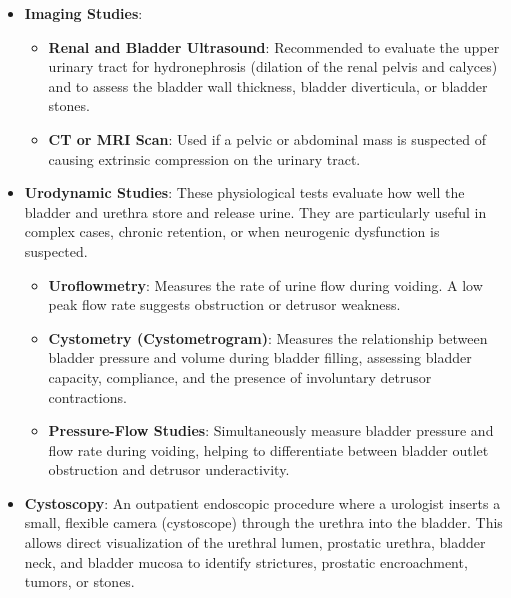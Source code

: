 \begin{itemize}
\begin{itemize}
        \item \textbf{Prostate-Specific Antigen (PSA)}: May be ordered for men to screen for prostate cancer, though it is important to note that acute urinary retention and bladder catheterization can cause transient, significant elevations in PSA levels.
    \end{itemize}
    \item \textbf{Imaging Studies}:
    \begin{itemize}
        \item \textbf{Renal and Bladder Ultrasound}: Recommended to evaluate the upper urinary tract for hydronephrosis (dilation of the renal pelvis and calyces) and to assess the bladder wall thickness, bladder diverticula, or bladder stones.
        \item \textbf{CT or MRI Scan}: Used if a pelvic or abdominal mass is suspected of causing extrinsic compression on the urinary tract.
    \end{itemize}
    \item \textbf{Urodynamic Studies}: These physiological tests evaluate how well the bladder and urethra store and release urine. They are particularly useful in complex cases, chronic retention, or when neurogenic dysfunction is suspected.
    \begin{itemize}
        \item \textbf{Uroflowmetry}: Measures the rate of urine flow during voiding. A low peak flow rate suggests obstruction or detrusor weakness.
        \item \textbf{Cystometry (Cystometrogram)}: Measures the relationship between bladder pressure and volume during bladder filling, assessing bladder capacity, compliance, and the presence of involuntary detrusor contractions.
        \item \textbf{Pressure-Flow Studies}: Simultaneously measure bladder pressure and flow rate during voiding, helping to differentiate between bladder outlet obstruction and detrusor underactivity.
    \end{itemize}
    \item \textbf{Cystoscopy}: An outpatient endoscopic procedure where a urologist inserts a small, flexible camera (cystoscope) through the urethra into the bladder. This allows direct visualization of the urethral lumen, prostatic urethra, bladder neck, and bladder mucosa to identify strictures, prostatic encroachment, tumors, or stones.
\end{itemize}

